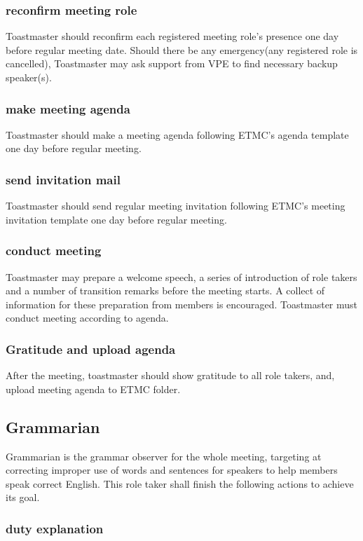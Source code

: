 \subsubsection{reconfirm meeting role}
Toastmaster should reconfirm each registered meeting role's presence one day before 
regular meeting date. Should there be any emergency(any registered role is cancelled),
Toastmaster may ask support from VPE to find necessary backup speaker(s).

\subsubsection{make meeting agenda}
Toastmaster should make a meeting agenda following ETMC's agenda template one day before 
regular meeting.

\subsubsection{send invitation mail}
Toastmaster should send regular meeting invitation following ETMC's meeting invitation 
template one day before regular meeting.

\subsubsection{conduct meeting}
Toastmaster may prepare a welcome speech, a series of introduction of role takers and 
a number of transition remarks before the meeting starts. A collect of information for
these preparation from members is encouraged. Toastmaster must conduct meeting according
to agenda.

\subsubsection{Gratitude and upload agenda}
After the meeting, toastmaster should show gratitude to all role takers, and, upload 
meeting agenda to ETMC folder. 

\subsection{Grammarian}

Grammarian is the grammar observer for the whole meeting, targeting at correcting improper 
use of words and sentences for speakers to help members speak correct English. This role 
taker shall finish the following actions to achieve its goal.

\subsubsection{duty explanation}

